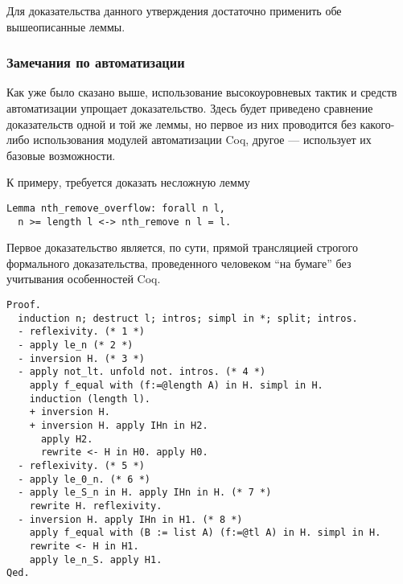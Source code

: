 Для доказательства данного утверждения достаточно применить обе вышеописанные леммы.

\subsubsection{Замечания по автоматизации}

Как уже было сказано выше, использование высокоуровневых тактик и средств автоматизации упрощает доказательство. Здесь будет приведено сравнение доказательств одной и той же леммы, но первое из них проводится без какого-либо использования модулей автоматизации Coq, другое --- использует их базовые возможности.

К примеру, требуется доказать несложную лемму
\begin{Verbatim}[fontsize=\small]
Lemma nth_remove_overflow: forall n l,
  n >= length l <-> nth_remove n l = l.
\end{Verbatim}

Первое доказательство является, по сути, прямой трансляцией строгого формального доказательства, проведенного человеком ``на бумаге'' без учитывания особенностей Coq.
\begin{Verbatim}[fontsize=\small]
Proof.
  induction n; destruct l; intros; simpl in *; split; intros.
  - reflexivity. (* 1 *)
  - apply le_n (* 2 *)
  - inversion H. (* 3 *)
  - apply not_lt. unfold not. intros. (* 4 *)
    apply f_equal with (f:=@length A) in H. simpl in H.
    induction (length l).
    + inversion H.
    + inversion H. apply IHn in H2.
      apply H2.
      rewrite <- H in H0. apply H0.
  - reflexivity. (* 5 *)
  - apply le_0_n. (* 6 *)
  - apply le_S_n in H. apply IHn in H. (* 7 *)
    rewrite H. reflexivity.
  - inversion H. apply IHn in H1. (* 8 *)
    apply f_equal with (B := list A) (f:=@tl A) in H. simpl in H.
    rewrite <- H in H1.
    apply le_n_S. apply H1.
Qed.
\end{Verbatim}

